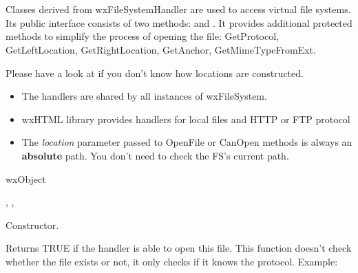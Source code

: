 %
%

\section{}\label{wxfilesystemhandler}

Classes derived from wxFileSystemHandler are used
to access virtual file systems. Its public interface consists
of two methods:  
and . 
It provides additional protected methods to simplify the process
of opening the file: GetProtocol, GetLeftLocation, GetRightLocation,
GetAnchor, GetMimeTypeFromExt.

Please have a look at  if you don't know how locations
are constructed.


\begin{itemize}\itemsep=0pt
\item The handlers are shared by all instances of wxFileSystem.
\item wxHTML library provides handlers for local files and HTTP or FTP protocol
\item The {\it location} parameter passed to OpenFile or CanOpen methods
is always an {\bf absolute} path. You don't need to check the FS's current path.
\end{itemize}


wxObject


, 
, 

\label{wxfilesystemhandlerwxfilesystemhandler}


Constructor.

\label{wxfilesystemhandlercanopen}


Returns TRUE if the handler is able to open this file. This function doesn't
check whether the file exists or not, it only checks if it knows the protocol.
Example:

